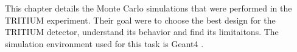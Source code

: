 This chapter details the Monte Carlo simulations that were performed in the TRITIUM experiment. Their goal were to choose the best design for the TRITIUM detector, understand its behavior and find its limitaitons. The simulation environment used for this task is Geant4 \cite{Geant4WebPage, Geant4P}.